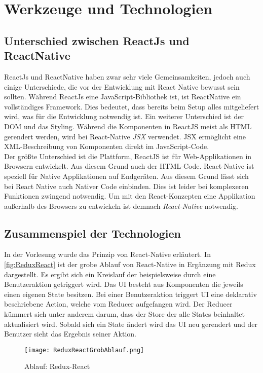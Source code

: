 \section{Werkzeuge und Technologien}
\subsection{Unterschied zwischen ReactJs und ReactNative}
ReactJs und ReactNative haben zwar sehr viele Gemeinsamkeiten, jedoch auch einige Unterschiede, die vor der Entwicklung mit React Native bewusst sein sollten.
Während ReactJs eine JavaScript-Bibliothek ist, ist ReactNative ein vollständiges Framework. Dies bedeutet, dass bereits beim Setup alles mitgeliefert wird, was für die
Entwicklung notwendig ist. Ein weiterer Unterschied ist der DOM und das Styling. Während die Komponenten in ReactJS meist als HTML gerendert werden, wird bei React-Native
\textit{JSX} verwendet. JSX ermöglicht eine XML-Beschreibung von Komponenten direkt im JavaScript-Code.\\
Der größte Unterschied ist die Plattform, ReactJS ist für Web-Applikationen in Browsern entwickelt. Aus diesem Grund auch der HTML-Code. React-Native ist speziell für Native Applikationen auf
Endgeräten. Aus diesem Grund lässt sich bei React Native auch Nativer Code einbinden. Dies ist leider bei komplexeren Funktionen zwingend notwendig. Um mit den React-Konzepten eine Applikation außerhalb des
Browsers zu entwickeln ist demnach \textit{React-Native} notwendig. \cite{ReactJSvsReactNative:online}

\subsection{Zusammenspiel der Technologien}
In der Vorlesung wurde das Prinzip von React-Native erläutert. In \autoref{fig:ReduxReact} ist
der grobe Ablauf von React-Native in Ergänzung mit Redux dargestellt. Es ergibt sich ein Kreislauf der beispielsweise durch
eine Benutzeraktion getriggert wird. Das UI besteht aus Komponenten die jeweils einen eigenen State besitzen. Bei einer Benutzeraktion
triggert UI eine deklarativ beschriebene Action, welche vom Reducer aufgefangen wird.
Der Reducer kümmert sich unter anderem darum, dass der Store der alle States beinhaltet aktualisiert wird.
Sobald sich ein State ändert wird das UI neu gerendert und der Benutzer sieht das Ergebnis seiner Aktion.

\begin{figure}[h]
    \centering
    \texttt{[image: ReduxReactGrobAblauf.png]}
    \caption{Ablauf: Redux-React}
    \label{fig:ReduxReact}
\end{figure}

